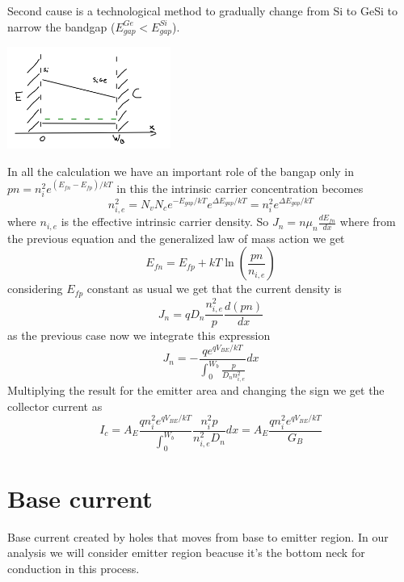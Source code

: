 Second cause is a technological method to gradually change from Si to GeSi to narrow the bandgap ($E_{gap}^{Ge}<E_{gap}^{Si}$).

\centering
\includegraphics[width=0.4\textwidth]{bjt6.png}\\
\raggedright

In all the calculation we have an important role of the bangap only in $pn=n_i^2e^{(E_{fn}-E_{fp})/kT}$ in this the intrinsic carrier concentration becomes
\begin{equation}
n_{i,e}^2=N_vN_ce^{-E_{gap}/kT}e^{\Delta E_{gap}/kT}=n_i^2e^{\Delta E_{gap}/kT}
\end{equation}
where $n_{i,e}$ is the effective intrinsic carrier density. 
So $J_n=n\mu_n \frac{dE_{fn}}{dx}$ where from the previous equation and the generalized law of mass action we get 
\begin{equation}
E_{fn}=E_{fp}+kT\ln(\frac{pn}{n_{i,e}})
\end{equation}
considering $E_{fp}$ constant as usual we get that the current density is 
\begin{equation}
J_n=qD_n \frac{n_{i,e}^2}{p}\frac{d(pn)}{dx}
\end{equation}
as the previous case now we integrate this expression 
\begin{equation}
J_n=-\frac{qe^{qV_{BE}/kT}}{\int^{W_b}_0 \frac{p}{D_nn_{i,e}^2}}dx
\end{equation}
Multiplying the result for the emitter area and changing the sign we get the collector current as 
\begin{equation}
I_c=A_E \frac{qn_i^2 e^{qV_{BE}/kT}}{\int^{W_{b}}_0} \frac{n_i^2p}{n_{i,e}^2D_n}dx=A_E \frac{qn_i^2 e^{qV_{BE}/kT}}{G_B}
\end{equation}


\section{Base current}

Base current created by holes that moves from base to emitter region. In our analysis we will consider emitter region beacuse it's the bottom neck for conduction in this process.

